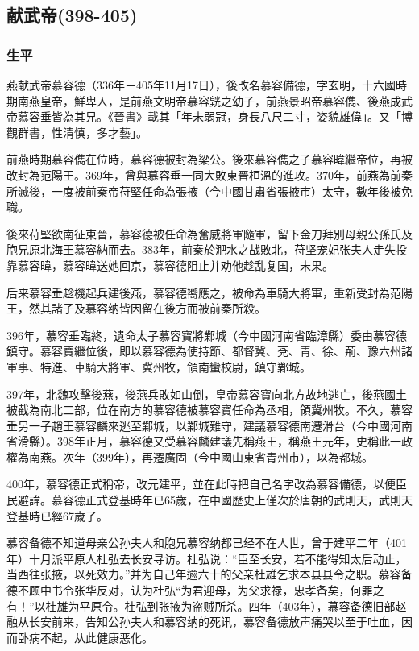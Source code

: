 
\subsection{献武帝\tiny(398-405)}

\subsubsection{生平}

燕献武帝慕容德（336年－405年11月17日），後改名慕容備德，字玄明，十六國時期南燕皇帝，鮮卑人，是前燕文明帝慕容皝之幼子，前燕景昭帝慕容儁、後燕成武帝慕容垂皆為其兄。《晉書》載其「年未弱冠，身長八尺二寸，姿貌雄偉」。又「博觀群書，性清慎，多才藝」。

前燕時期慕容儁在位時，慕容德被封為梁公。後來慕容儁之子慕容暐繼帝位，再被改封為范陽王。369年，曾與慕容垂一同大敗東晉桓溫的進攻。370年，前燕為前秦所滅後，一度被前秦帝苻堅任命為張掖（今中國甘肅省張掖市）太守，數年後被免職。

後來苻堅欲南征東晉，慕容德被任命為奮威將軍隨軍，留下金刀拜別母親公孫氏及胞兄原北海王慕容納而去。383年，前秦於淝水之战敗北，苻坚宠妃张夫人走失投靠慕容暐，慕容暐送她回京，慕容德阻止并劝他趁乱复国，未果。

后来慕容垂趁機起兵建後燕，慕容德嚮應之，被命為車騎大將軍，重新受封為范陽王，然其諸子及慕容纳皆因留在後方而被前秦所殺。

396年，慕容垂臨終，遺命太子慕容寶將鄴城（今中國河南省臨漳縣）委由慕容德鎮守。慕容寶繼位後，即以慕容德為使持節、都督冀、兗、青、徐、荊、豫六州諸軍事、特進、車騎大將軍、冀州牧，領南蠻校尉，鎮守鄴城。

397年，北魏攻擊後燕，後燕兵敗如山倒，皇帝慕容寶向北方故地逃亡，後燕國土被截為南北二部，位在南方的慕容德被慕容寶任命為丞相，領冀州牧。不久，慕容垂另一子趙王慕容麟來逃至鄴城，以鄴城難守，建議慕容德南遷滑台（今中國河南省滑縣）。398年正月，慕容德又受慕容麟建議先稱燕王，稱燕王元年，史稱此一政權為南燕。次年（399年），再遷廣固（今中國山東省青州市），以為都城。

400年，慕容德正式稱帝，改元建平，並在此時把自己名字改為慕容備德，以便臣民避諱。慕容德正式登基時年已65歲，在中國歷史上僅次於唐朝的武則天，武則天登基時已經67歲了。

慕容备德不知道母亲公孙夫人和胞兄慕容纳都已经不在人世，曾于建平二年（401年）十月派平原人杜弘去长安寻访。杜弘说：“臣至长安，若不能得知太后动止，当西往张掖，以死效力。”并为自己年逾六十的父亲杜雄乞求本县县令之职。慕容备德不顾中书令张华反对，认为杜弘“为君迎母，为父求禄，忠孝备矣，何罪之有！”以杜雄为平原令。杜弘到张掖为盗贼所杀。四年（403年），慕容备德旧部赵融从长安前来，告知公孙夫人和慕容纳的死讯，慕容备德放声痛哭以至于吐血，因而卧病不起，从此健康恶化。

